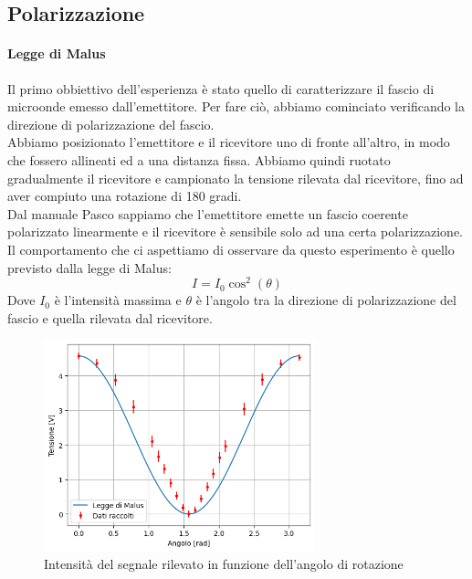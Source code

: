 \documentclass[letterpaper,12pt]{article}
\begin{document}
\subsection{Polarizzazione}
\paragraph*{Legge di Malus}
Il primo obbiettivo dell'esperienza è stato quello di caratterizzare il fascio di microonde emesso dall'emettitore.
Per fare ciò, abbiamo cominciato verificando la direzione di polarizzazione del fascio. \\
Abbiamo posizionato l'emettitore e il ricevitore uno di fronte all'altro, in modo che fossero
allineati ed a una distanza fissa. Abbiamo quindi ruotato gradualmente il ricevitore e campionato
la tensione rilevata dal ricevitore, fino ad aver compiuto una rotazione di 180 gradi.\\
Dal manuale Pasco sappiamo che l'emettitore emette un fascio coerente polarizzato linearmente
e il ricevitore è sensibile solo ad una certa polarizzazione. Il comportamento che ci aspettiamo
di osservare da questo esperimento è quello previsto dalla legge di Malus:
\begin{equation}
	I = I_0 \cos^2(\theta)
	\label{eq:malus}
\end{equation}
Dove $I_0$ è l'intensità massima e $\theta$ è l'angolo tra la direzione di polarizzazione del fascio e quella rilevata dal ricevitore.\\

\begin{figure}[h!]
	\centering
	\includegraphics[width = 0.7\textwidth]{polarizzazione.png}
	\caption{Intensità del segnale rilevato in funzione dell'angolo di rotazione}
	\label{fig:polarizzazione}
\end{figure}
\end{document}
